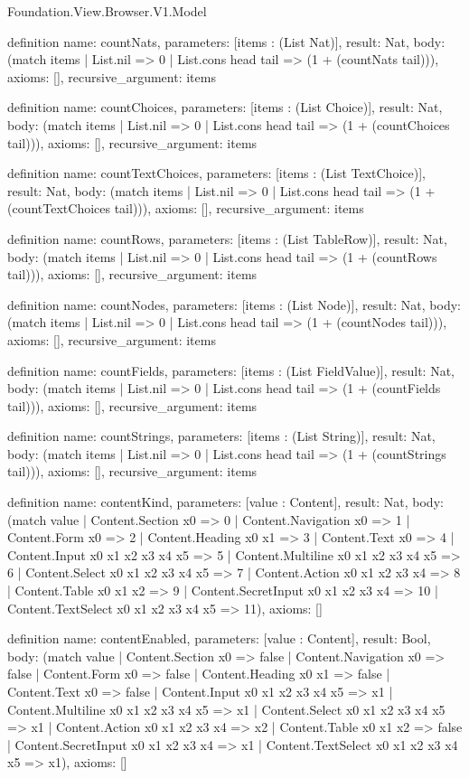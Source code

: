 \begin{lexlean}{Foundation.View.Browser.V1.Model}
\begin{semanticmodule}
definition{
  name: countNats,
  parameters: [items : (List Nat)],
  result: Nat,
  body: (match items | List.nil => 0 | List.cons head tail => (1 + (countNats tail))),
  axioms: [],
  recursive_argument: items
}

definition{
  name: countChoices,
  parameters: [items : (List Choice)],
  result: Nat,
  body: (match items | List.nil => 0 | List.cons head tail => (1 + (countChoices tail))),
  axioms: [],
  recursive_argument: items
}

definition{
  name: countTextChoices,
  parameters: [items : (List TextChoice)],
  result: Nat,
  body: (match items | List.nil => 0 | List.cons head tail => (1 + (countTextChoices tail))),
  axioms: [],
  recursive_argument: items
}

definition{
  name: countRows,
  parameters: [items : (List TableRow)],
  result: Nat,
  body: (match items | List.nil => 0 | List.cons head tail => (1 + (countRows tail))),
  axioms: [],
  recursive_argument: items
}

definition{
  name: countNodes,
  parameters: [items : (List Node)],
  result: Nat,
  body: (match items | List.nil => 0 | List.cons head tail => (1 + (countNodes tail))),
  axioms: [],
  recursive_argument: items
}

definition{
  name: countFields,
  parameters: [items : (List FieldValue)],
  result: Nat,
  body: (match items | List.nil => 0 | List.cons head tail => (1 + (countFields tail))),
  axioms: [],
  recursive_argument: items
}

definition{
  name: countStrings,
  parameters: [items : (List String)],
  result: Nat,
  body: (match items | List.nil => 0 | List.cons head tail => (1 + (countStrings tail))),
  axioms: [],
  recursive_argument: items
}

definition{
  name: contentKind,
  parameters: [value : Content],
  result: Nat,
  body: (match value
    | Content.Section x0 => 0
    | Content.Navigation x0 => 1
    | Content.Form x0 => 2
    | Content.Heading x0 x1 => 3
    | Content.Text x0 => 4
    | Content.Input x0 x1 x2 x3 x4 x5 => 5
    | Content.Multiline x0 x1 x2 x3 x4 x5 => 6
    | Content.Select x0 x1 x2 x3 x4 x5 => 7
    | Content.Action x0 x1 x2 x3 x4 => 8
    | Content.Table x0 x1 x2 => 9
    | Content.SecretInput x0 x1 x2 x3 x4 => 10
    | Content.TextSelect x0 x1 x2 x3 x4 x5 => 11),
  axioms: []
}

definition{
  name: contentEnabled,
  parameters: [value : Content],
  result: Bool,
  body: (match value
    | Content.Section x0 => false
    | Content.Navigation x0 => false
    | Content.Form x0 => false
    | Content.Heading x0 x1 => false
    | Content.Text x0 => false
    | Content.Input x0 x1 x2 x3 x4 x5 => x1
    | Content.Multiline x0 x1 x2 x3 x4 x5 => x1
    | Content.Select x0 x1 x2 x3 x4 x5 => x1
    | Content.Action x0 x1 x2 x3 x4 => x2
    | Content.Table x0 x1 x2 => false
    | Content.SecretInput x0 x1 x2 x3 x4 => x1
    | Content.TextSelect x0 x1 x2 x3 x4 x5 => x1),
  axioms: []
}


\end{semanticmodule}
\end{lexlean}
